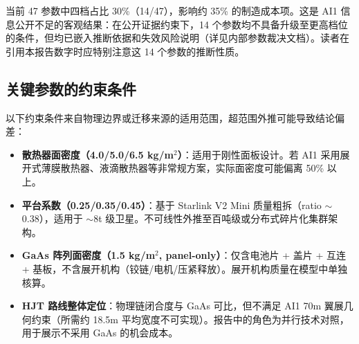 当前 47 参数中四档占比 30\%（14/47），影响约 35\% 的制造成本项。这是 AI1 信息公开不足的客观结果：在公开证据约束下，14 个参数均不具备升级至更高档位的条件，但均已嵌入推断依据和失效风险说明（详见内部参数裁决文档）。读者在引用本报告数字时应特别注意这 14 个参数的推断性质。

\subsection{关键参数的约束条件}
\label{sec:param-constraints}

以下约束条件来自物理边界或迁移来源的适用范围，超范围外推可能导致结论偏差：

\begin{itemize}
  \item \textbf{散热器面密度（4.0/5.0/6.5 kg/m$^2$）}：适用于刚性面板设计。若 AI1 采用展开式薄膜散热器、液滴散热器等非常规方案，实际面密度可能偏离 50\% 以上。

  \item \textbf{平台系数（0.25/0.35/0.45）}：基于 Starlink V2 Mini 质量粗拆（ratio $\sim$0.38），适用于 $\sim$8t 级卫星。不可线性外推至百吨级或分布式碎片化集群架构。

  \item \textbf{GaAs 阵列面密度（1.5 kg/m$^2$, panel-only）}：仅含电池片 + 盖片 + 互连 + 基板，不含展开机构（铰链/电机/压紧释放）。展开机构质量在模型中单独核算。

  \item \textbf{HJT 路线整体定位}：物理链闭合度与 GaAs 可比，但不满足 AI1 70m 翼展几何约束（所需约 18.5m 平均宽度不可实现）。报告中的角色为并行技术对照，用于展示不采用 GaAs 的机会成本。
\end{itemize}
